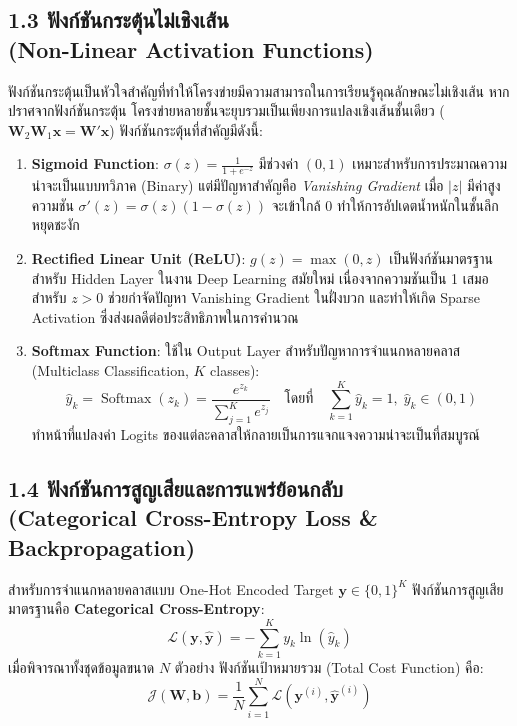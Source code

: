 \documentclass[12pt,a4paper]{article}
\begin{document}
\subsection*{1.3 ฟังก์ชันกระตุ้นไม่เชิงเส้น\\ \normalsize(Non-Linear Activation Functions)}
ฟังก์ชันกระตุ้นเป็นหัวใจสำคัญที่ทำให้โครงข่ายมีความสามารถในการเรียนรู้คุณลักษณะไม่เชิงเส้น หากปราศจากฟังก์ชันกระตุ้น โครงข่ายหลายชั้นจะยุบรวมเป็นเพียงการแปลงเชิงเส้นชั้นเดียว ($\mathbf{W}_2 \mathbf{W}_1 \mathbf{x} = \mathbf{W}' \mathbf{x}$) ฟังก์ชันกระตุ้นที่สำคัญมีดังนี้:
\begin{enumerate}[leftmargin=18pt, itemsep=3pt]
    \item \textbf{Sigmoid Function}: $\sigma(z) = \frac{1}{1 + e^{-z}}$ มีช่วงค่า $(0, 1)$ เหมาะสำหรับการประมาณความน่าจะเป็นแบบทวิภาค (Binary) แต่มีปัญหาสำคัญคือ \textit{Vanishing Gradient} เมื่อ $|z|$ มีค่าสูง ความชัน $\sigma'(z) = \sigma(z)(1 - \sigma(z))$ จะเข้าใกล้ 0 ทำให้การอัปเดตน้ำหนักในชั้นลึกหยุดชะงัก
    \item \textbf{Rectified Linear Unit (ReLU)}: $g(z) = \max(0, z)$ เป็นฟังก์ชันมาตรฐานสำหรับ Hidden Layer ในงาน Deep Learning สมัยใหม่ เนื่องจากความชันเป็น 1 เสมอสำหรับ $z > 0$ ช่วยกำจัดปัญหา Vanishing Gradient ในฝั่งบวก และทำให้เกิด Sparse Activation ซึ่งส่งผลดีต่อประสิทธิภาพในการคำนวณ
    \item \textbf{Softmax Function}: ใช้ใน Output Layer สำหรับปัญหาการจำแนกหลายคลาส (Multiclass Classification, $K$ classes):
    \begin{equation}
    \hat{y}_k = \operatorname{Softmax}(z_k) = \frac{e^{z_k}}{\sum_{j=1}^K e^{z_j}} \quad \text{โดยที่} \quad \sum_{k=1}^K \hat{y}_k = 1, \; \hat{y}_k \in (0, 1)
    \end{equation}
    ทำหน้าที่แปลงค่า Logits ของแต่ละคลาสให้กลายเป็นการแจกแจงความน่าจะเป็นที่สมบูรณ์
\end{enumerate}

\subsection*{1.4 ฟังก์ชันการสูญเสียและการแพร่ย้อนกลับ\\ \normalsize(Categorical Cross-Entropy Loss \& Backpropagation)}
สำหรับการจำแนกหลายคลาสแบบ One-Hot Encoded Target $\mathbf{y} \in \{0, 1\}^K$ ฟังก์ชันการสูญเสียมาตรฐานคือ \textbf{Categorical Cross-Entropy}:
\begin{equation}
\mathcal{L}(\mathbf{y}, \hat{\mathbf{y}}) = -\sum_{k=1}^K y_k \ln(\hat{y}_k)
\end{equation}
เมื่อพิจารณาทั้งชุดข้อมูลขนาด $N$ ตัวอย่าง ฟังก์ชันเป้าหมายรวม (Total Cost Function) คือ:
\begin{equation}
\mathcal{J}(\mathbf{W}, \mathbf{b}) = \frac{1}{N} \sum_{i=1}^N \mathcal{L}(\mathbf{y}^{(i)}, \hat{\mathbf{y}}^{(i)})
\end{equation}
\end{document}
